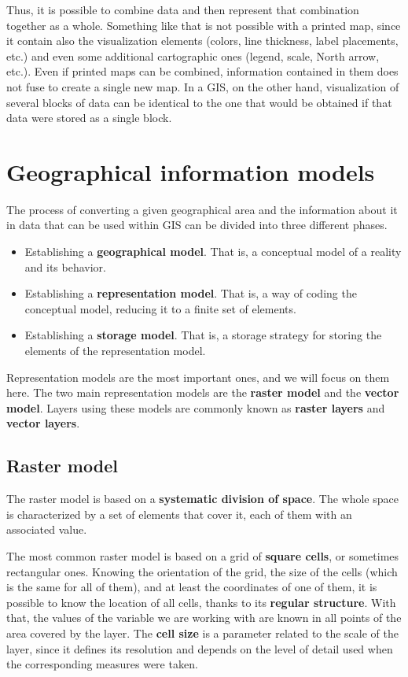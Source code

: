 Thus, it is possible to combine data and then represent that combination together as a whole. Something like that is not possible with a printed map, since it contain also the visualization elements (colors, line thickness, label placements, etc.) and even some additional cartographic ones (legend, scale, North arrow, etc.). Even if printed maps can be combined, information contained in them does not fuse to create a single new map. In a GIS, on the other hand, visualization of several blocks of data can be identical to the one that would be obtained if that data were stored as a single block.


\section{Geographical information models}

The process of converting a given geographical area and the information about it in data that can be used within GIS can be divided into three different phases.

\begin{itemize}
 \item Establishing a \textbf{geographical model}. That is, a conceptual model of a reality and its behavior.
\item Establishing a \textbf{representation model}. That is, a way of coding the conceptual model, reducing it to a finite set of elements.
\item Establishing a \textbf{storage model}. That is, a storage strategy for storing the elements of the representation model.
\end{itemize}

Representation models are the most important ones, and we will focus on them here. The two main representation models are the \textbf{raster model} and the \textbf{vector model}. Layers using these models are commonly known as \textbf{raster layers} and \textbf{vector layers}.

\subsection{Raster model}

The raster model is based on a \textbf{systematic division of space}. The whole space is characterized by a set of elements that cover it, each of them with an associated value.

The most common raster model is based on a grid of \textbf{square cells}, or sometimes rectangular ones. Knowing the orientation of the grid, the size of the cells (which is the same for all of them), and at least the coordinates of one of them, it is possible to know the location of all cells, thanks to its \textbf{regular structure}. With that, the values of the variable we are working with are known in all points of the area covered by the layer. The \textbf{cell size} is a parameter related to the scale of the layer, since it defines its resolution and depends on the level of detail used when the corresponding measures were taken.

